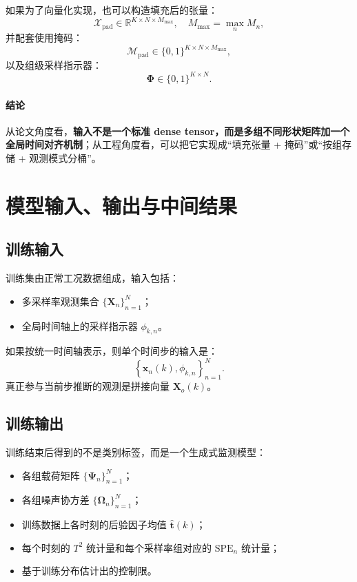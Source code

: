 \documentclass[UTF8]{ctexart}
\begin{document}
如果为了向量化实现，也可以构造填充后的张量：
\begin{equation}
    \mathcal{X}_{\mathrm{pad}} \in \mathbb{R}^{K \times N \times M_{\max}}, \quad M_{\max}=\max_n M_n,
\end{equation}
并配套使用掩码：
\begin{equation}
    \mathcal{M}_{\mathrm{pad}} \in \{0,1\}^{K \times N \times M_{\max}},
\end{equation}
以及组级采样指示器：
\begin{equation}
    \bm{\Phi} \in \{0,1\}^{K \times N}.
\end{equation}

\paragraph{结论}
从论文角度看，\textbf{输入不是一个标准 dense tensor，而是多组不同形状矩阵加一个全局时间对齐机制}；从工程角度看，可以把它实现成“填充张量 + 掩码”或“按组存储 + 观测模式分桶”。

\section{模型输入、输出与中间结果}

\subsection{训练输入}

训练集由正常工况数据组成，输入包括：
\begin{itemize}
    \item 多采样率观测集合 $\{\bm{X}_n\}_{n=1}^{N}$；
    \item 全局时间轴上的采样指示器 $\phi_{k,n}$。
\end{itemize}

如果按统一时间轴表示，则单个时间步的输入是：
\begin{equation}
    \left\{\bm{x}_n(k), \phi_{k,n}\right\}_{n=1}^{N}.
\end{equation}
真正参与当前步推断的观测是拼接向量 $\bm{X}_o(k)$。

\subsection{训练输出}

训练结束后得到的不是类别标签，而是一个生成式监测模型：
\begin{itemize}
    \item 各组载荷矩阵 $\{\bm{\Psi}_n\}_{n=1}^{N}$；
    \item 各组噪声协方差 $\{\bm{\Omega}_n\}_{n=1}^{N}$；
    \item 训练数据上各时刻的后验因子均值 $\hat{\bm{t}}(k)$；
    \item 每个时刻的 $T^2$ 统计量和每个采样率组对应的 $\mathrm{SPE}_n$ 统计量；
    \item 基于训练分布估计出的控制限。
\end{itemize}
\end{document}
